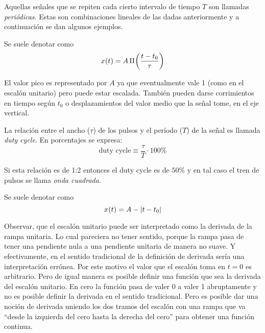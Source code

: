 \documentclass[a5paper,12pt,twoside]{book}
\begin{document}
Aquellas señales que se repiten cada cierto intervalo de tiempo $T$ son llamadas \emph{periódicas}. Estas son combinaciones lineales de las dadas anteriormente y a continuación se dan algunos ejemplos.


Se suele denotar como
\begin{equation*}
    \fx[x]{t} = A \, \fx[\Pi]{\frac{t-t_0}{\tau}}
\end{equation*}


El valor pico es representado por $A$ ya que eventualmente vale 1 (como en el escalón unitario) pero puede estar escalada. También pueden darse corrimientos en tiempo según $t_0$ o desplazamientos del valor medio que la señal tome, en el eje vertical.

La relación entre el ancho ($\tau$) de los pulsos y el período ($T$) de la señal es llamada \emph{duty cycle}. En porcentajes se expresa:
\begin{equation*}
    \text{duty cycle}  \equiv \frac{\tau}{T} \cdot 100\%
\end{equation*}

Si esta relación es de 1:2 entonces el duty cycle es de $50\%$ y en tal caso el tren de pulsos se llama \emph{onda cuadrada}.


Se suele denotar como
\begin{equation*}
    \fx[x]{t} = A - \norm{t-t_0}
\end{equation*}




Observar, que el escalón unitario puede ser interpretado como la derivada de la rampa unitaria. Lo cual pareciera no tener sentido, porque la rampa pasa de tener una pendiente nula a una pendiente unitaria de manera no suave. Y efectivamente, en el sentido tradicional de la definición de derivada sería una interpretación errónea. Por este motivo el valor que el escalón toma en $t=0$ es arbitrario. Pero de igual manera es posible definir una función que sea la derivada del escalón unitario. En cero la función pasa de valer 0 a valer 1 abruptamente y no es posible definir la derivada en el sentido tradicional. Pero es posible dar una noción de derivada uniendo los dos tramos del escalón con una rampa que va ``desde la izquierda del cero hasta la derecha del cero'' para obtener una función continua.
\end{document}
